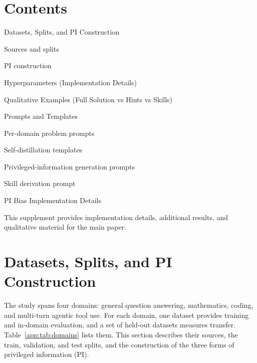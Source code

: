 \documentclass{article}
\begin{document}

\clearpage



\clearpage

\appendix
\renewcommand{\thesection}{\Alph{section}}
\renewcommand{\thesubsection}{\Alph{section}.\arabic{subsection}}

\newcommand{\tocsec}[3]{\noindent\makebox[1.6em][l]{#1}#2\ \dotfill\ \pageref{#3}\par}
\newcommand{\tocsub}[3]{\noindent\hspace{1.6em}\makebox[2.2em][l]{#1}#2\ \dotfill\ \pageref{#3}\par\vspace{-0.15em}}
\section*{Contents}
{\small
\tocsec{A}{Datasets, Splits, and PI Construction}{app:data}
\tocsub{A.1}{Sources and splits}{app:sub:sources}
\tocsub{A.2}{PI construction}{app:sub:piconstruct}
\tocsec{B}{Hyperparameters (Implementation Details)}{app:hyper}
\tocsec{C}{Qualitative Examples (Full Solution vs Hints vs Skills)}{app:qual}
\tocsec{D}{Prompts and Templates}{app:prompts}
\tocsub{D.1}{Per-domain problem prompts}{app:sub:promptdomain}
\tocsub{D.2}{Self-distillation templates}{app:sub:sdtemplate}
\tocsub{D.3}{Privileged-information generation prompts}{app:sub:pigen}
\tocsub{D.4}{Skill derivation prompt}{app:sub:skill}
\tocsec{E}{PI Bias Implementation Details}{app:pibias}
}
\bigskip

This supplement provides implementation details, additional results, and
qualitative material for the main paper.

\clearpage

\section{Datasets, Splits, and PI Construction}
\label{app:data}

The study spans four domains: general question answering, mathematics, coding,
and multi-turn agentic tool use. For each domain, one dataset provides training
and in-domain evaluation, and a set of held-out datasets measures transfer.
Table~\ref{app:tab:domains} lists them. This section describes their sources, the
train, validation, and test splits, and the construction of the three forms of
privileged information (PI).
\end{document}

